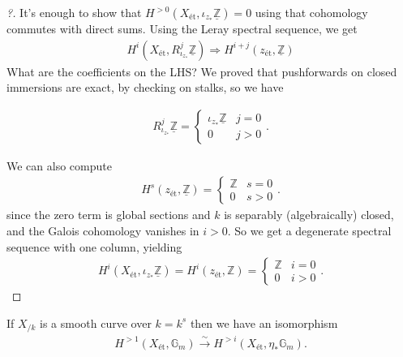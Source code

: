 \begin{proof}[?]

It's enough to show that
\(H^{>0}(X_\text{ét}, \iota_{z_*} \underline{{\mathbb{Z}}}) = 0\) using
that cohomology commutes with direct sums. Using the Leray spectral
sequence, we get
\begin{align*}
H^i(X_\text{ét}, R^j_{\iota_{z_*}} \underline{{\mathbb{Z}}})\Rightarrow H^{i+j}(z_\text{ét}, \underline{{\mathbb{Z}}})
\end{align*}
What are the coefficients on the LHS? We proved that pushforwards on
closed immersions are exact, by checking on stalks, so we have

\begin{align*}  
R^j _{\iota_{z_*}} \underline{{\mathbb{Z}}}
=
\begin{cases}
\iota_{z_*} \underline{{\mathbb{Z}}}& j = 0 \\
0 & j > 0
\end{cases}
.\end{align*}

We can also compute
\begin{align*}  
H^s(z_\text{ét}, \underline{{\mathbb{Z}}})
=
\begin{cases}
{\mathbb{Z}}& s = 0 \\
0 & s>0
\end{cases}
.\end{align*}
since the zero term is global sections and \(k\) is separably
(algebraically) closed, and the Galois cohomology vanishes in \(i>0\).
So we get a degenerate spectral sequence with one column, yielding
\begin{align*}  
H^i (X_\text{ét}, \iota_{z_*} \underline{{\mathbb{Z}}}) 
=
H^i(z_{\text{ét}}, {\mathbb{Z}})
=
\begin{cases}
{\mathbb{Z}}& i = 0 \\
0 & i> 0
\end{cases}
.\end{align*}

\end{proof}

\begin{corollary}[?]

If \(X_{/k}\) is a smooth curve over \(k=k^{s}\) then we have an
isomorphism
\begin{align*}  
H^{>1}(X_\text{ét}, {\mathbb{G}}_m) \xrightarrow{\sim}H^{>i}(X_\text{ét}, \eta_* {\mathbb{G}}_m)
.\end{align*}

\end{corollary}

